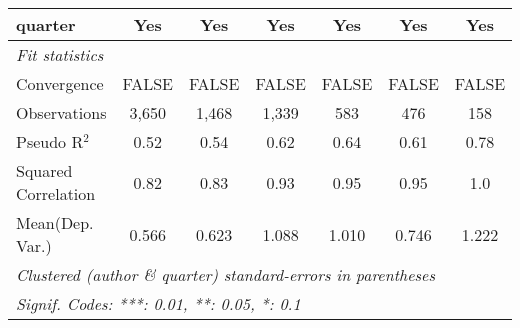 \begin{tabular}{lcccccc}
   quarter                                                    & Yes          & Yes           & Yes          & Yes           & Yes           & Yes\\  
   \midrule
   \emph{Fit statistics}\\
   Convergence                                                &FALSE         & FALSE         & FALSE        & FALSE         & FALSE         & FALSE\\  
   Observations                                               & 3,650        & 1,468         & 1,339        & 583           & 476           & 158\\  
   Pseudo R$^2$                                               & 0.52         & 0.54          & 0.62         & 0.64          & 0.61          & 0.78\\  
   Squared Correlation                                        & 0.82         & 0.83          & 0.93         & 0.95          & 0.95          & 1.0\\  
Mean(Dep. Var.) & 0.566 & 0.623 & 1.088 & 1.010 & 0.746 & 1.222 \\
   \midrule \midrule
   \multicolumn{7}{l}{\emph{Clustered (author \& quarter) standard-errors in parentheses}}\\
   \multicolumn{7}{l}{\emph{Signif. Codes: ***: 0.01, **: 0.05, *: 0.1}}\\
\end{tabular}
\par\endgroup
